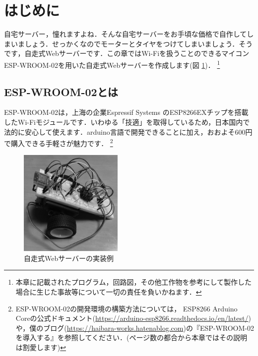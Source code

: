 \section{はじめに}
自宅サーバー，憧れますよね．そんな自宅サーバーをお手頃な価格で自作してしまいましょう．せっかくなのでモーターとタイヤをつけてしまいましょう．そうです，自走式Webサーバーです．この章ではWi-Fiを扱うことのできるマイコン ESP-WROOM-02を用いた自走式Webサーバーを作成します(図 \ref{fig:webserver})．
\footnote{本章に記載されたプログラム，回路図，その他工作物を参考にして製作した場合に生じた事故等について一切の責任を負いかねます．}
\subsection{ESP-WROOM-02とは}
ESP-WROOM-02は，上海の企業Espressif Systems のESP8266EXチップを搭載したWi-Fiモジュールです．いわゆる「技適」を取得しているため，日本国内で法的に安心して使えます．arduino言語で開発できることに加え，おおよそ600円で購入できる手軽さが魅力です．
\footnote{ESP-WROOM-02の開発環境の構築方法については， ESP8266 Arduino Coreの公式ドキュメント(\url{https://arduino-esp8266.readthedocs.io/en/latest/})や，僕のブログ(\url{https://haibara-works.hatenablog.com})の『ESP-WROOM-02を導入する』を参照してください．(ページ数の都合から本章ではその説明は割愛します)}

\begin{figure}[htbp]
    \centering
    \includegraphics[width=50mm]{./assets/haibaraaaaaaaasset/webserver.jpg}
    \caption{自走式Webサーバーの実装例}
    \label{fig:webserver}
\end{figure}

